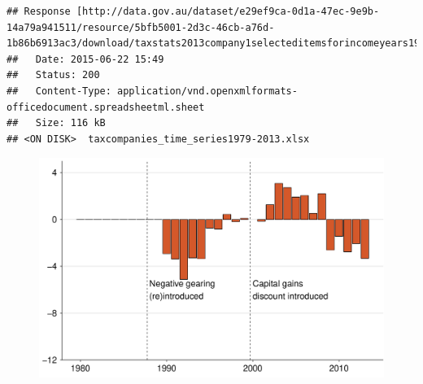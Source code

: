 \documentclass{grattan}\usepackage[]{graphicx}\usepackage[]{color}
\makeatletter
\newenvironment{kframe}{%
 \def\at@end@of@kframe{}%
 \ifinner\ifhmode%
  \def\at@end@of@kframe{\end{minipage}}%
  \begin{minipage}{\columnwidth}%
 \fi\fi%
 \def\FrameCommand##1{\hskip\@totalleftmargin \hskip-\fboxsep
 \colorbox{shadecolor}{##1}\hskip-\fboxsep
     \hskip-\linewidth \hskip-\@totalleftmargin \hskip\columnwidth}%
 \MakeFramed {\advance\hsize-\width
   \@totalleftmargin\z@ \linewidth\hsize
   \@setminipage}}%
 {\par\unskip\endMakeFramed%
 \at@end@of@kframe}
\newenvironment{knitrout}{}{} %
\makeatother
\begin{document}
\begin{knitrout}
\color{fgcolor}\begin{kframe}
\begin{verbatim}
## Response [http://data.gov.au/dataset/e29ef9ca-0d1a-47ec-9e9b-14a79a941511/resource/5bfb5001-2d3c-46cb-a76d-1b86b6913ac3/download/taxstats2013company1selecteditemsforincomeyears197980to201213.xlsx]
##   Date: 2015-06-22 15:49
##   Status: 200
##   Content-Type: application/vnd.openxmlformats-officedocument.spreadsheetml.sheet
##   Size: 116 kB
## <ON DISK>  taxcompanies_time_series1979-2013.xlsx
\end{verbatim}
\end{kframe}
\end{knitrout}


\begin{figure}[t]
\includegraphics[width=\columnwidth]{figure/Net_rent_over_time_companies-1}
\end{figure}
\end{document}
